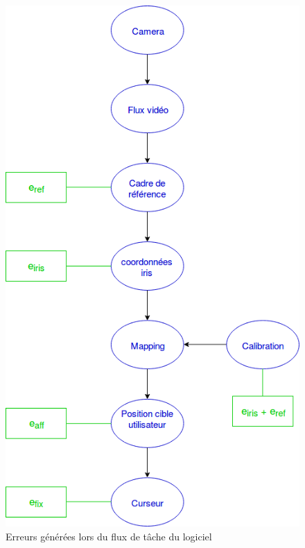\documentclass[a4paper, 12pt]{report}
\begin{document}
    	\begin{figure}
    	\centering
    	\includegraphics[scale=0.7]{flux_erreur.png}
    	\caption{Erreurs générées lors du flux de tâche du logiciel}
    	\end{figure}
    	\newpage
    	
\end{document}
